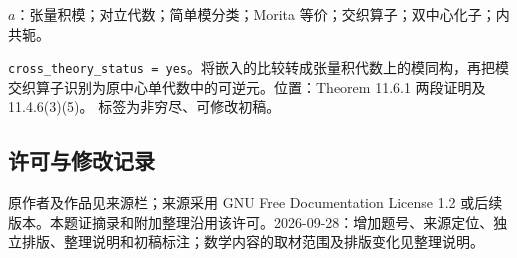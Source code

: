 \documentclass[UTF8,11pt]{ctexart}
\theoremstyle{definition}
\begin{document}
$a$：张量积模；对立代数；简单模分类；Morita 等价；交织算子；双中心化子；内共轭。

\texttt{cross\_theory\_status = yes}。将嵌入的比较转成张量积代数上的模同构，再把模交织算子识别为原中心单代数中的可逆元。位置：Theorem 11.6.1 两段证明及 11.4.6(3)(5)。
标签为非穷尽、可修改初稿。
\subsection*{许可与修改记录}
原作者及作品见来源栏；来源采用 GNU Free Documentation License 1.2 或后续版本。本题证摘录和附加整理沿用该许可。2026-09-28：增加题号、来源定位、独立排版、整理说明和初稿标注；数学内容的取材范围及排版变化见整理说明。
\end{document}
